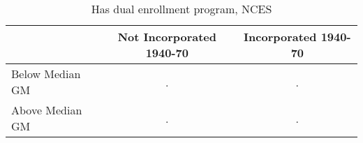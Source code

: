\begin{table}[htbp]\centering
\caption{Has dual enrollment program, NCES}
\begin{tabular}{l*{2}{c}}
\hline\hline
                    &Not Incorporated 1940-70&Incorporated 1940-70\\
\hline
Below Median GM     &           .&           .\\
Above Median GM     &           .&           .\\
\hline\hline
\end{tabular}
\end{table}
